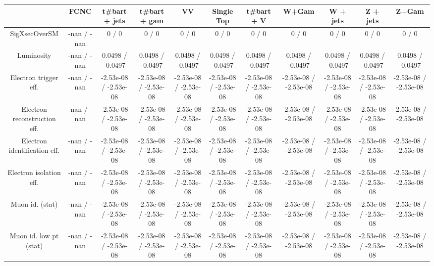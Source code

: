 \begin{table}[htbp]
\begin{center}
\footnotesize
\begin{tabular}{|c|c|c|c|c|c|c|c|c|c|c|}
\hline 
      & FCNC      & t#bar{t} + jets      & t#bar{t} +  gam      & VV      & Single Top      & t#bar{t} + V      & W+Gam      & W + jets      & Z + jets      & Z+Gam \\ 
\hline 
 SigXsecOverSM & -nan / -nan & 0 / 0 & 0 / 0 & 0 / 0 & 0 / 0 & 0 / 0 & 0 / 0 & 0 / 0 & 0 / 0 & 0 / 0 \\ 
  Luminosity & -nan / -nan & 0.0498 / -0.0497 & 0.0498 / -0.0497 & 0.0498 / -0.0497 & 0.0498 / -0.0497 & 0.0498 / -0.0497 & 0.0498 / -0.0497 & 0.0498 / -0.0497 & 0.0498 / -0.0497 & 0.0498 / -0.0497 \\ 
  Electron trigger eff. & -nan / -nan & -2.53e-08 / -2.53e-08 & -2.53e-08 / -2.53e-08 & -2.53e-08 / -2.53e-08 & -2.53e-08 / -2.53e-08 & -2.53e-08 / -2.53e-08 & -2.53e-08 / -2.53e-08 & -2.53e-08 / -2.53e-08 & -2.53e-08 / -2.53e-08 & -2.53e-08 / -2.53e-08 \\ 
  Electron reconstruction eff. & -nan / -nan & -2.53e-08 / -2.53e-08 & -2.53e-08 / -2.53e-08 & -2.53e-08 / -2.53e-08 & -2.53e-08 / -2.53e-08 & -2.53e-08 / -2.53e-08 & -2.53e-08 / -2.53e-08 & -2.53e-08 / -2.53e-08 & -2.53e-08 / -2.53e-08 & -2.53e-08 / -2.53e-08 \\ 
  Electron identification eff. & -nan / -nan & -2.53e-08 / -2.53e-08 & -2.53e-08 / -2.53e-08 & -2.53e-08 / -2.53e-08 & -2.53e-08 / -2.53e-08 & -2.53e-08 / -2.53e-08 & -2.53e-08 / -2.53e-08 & -2.53e-08 / -2.53e-08 & -2.53e-08 / -2.53e-08 & -2.53e-08 / -2.53e-08 \\ 
  Electron isolation eff. & -nan / -nan & -2.53e-08 / -2.53e-08 & -2.53e-08 / -2.53e-08 & -2.53e-08 / -2.53e-08 & -2.53e-08 / -2.53e-08 & -2.53e-08 / -2.53e-08 & -2.53e-08 / -2.53e-08 & -2.53e-08 / -2.53e-08 & -2.53e-08 / -2.53e-08 & -2.53e-08 / -2.53e-08 \\ 
  Muon id. (stat) & -nan / -nan & -2.53e-08 / -2.53e-08 & -2.53e-08 / -2.53e-08 & -2.53e-08 / -2.53e-08 & -2.53e-08 / -2.53e-08 & -2.53e-08 / -2.53e-08 & -2.53e-08 / -2.53e-08 & -2.53e-08 / -2.53e-08 & -2.53e-08 / -2.53e-08 & -2.53e-08 / -2.53e-08 \\ 
  Muon id. low pt (stat) & -nan / -nan & -2.53e-08 / -2.53e-08 & -2.53e-08 / -2.53e-08 & -2.53e-08 / -2.53e-08 & -2.53e-08 / -2.53e-08 & -2.53e-08 / -2.53e-08 & -2.53e-08 / -2.53e-08 & -2.53e-08 / -2.53e-08 & -2.53e-08 / -2.53e-08 & -2.53e-08 / -2.53e-08 \\ 

\end{tabular}
\end{center}
\end{table}
